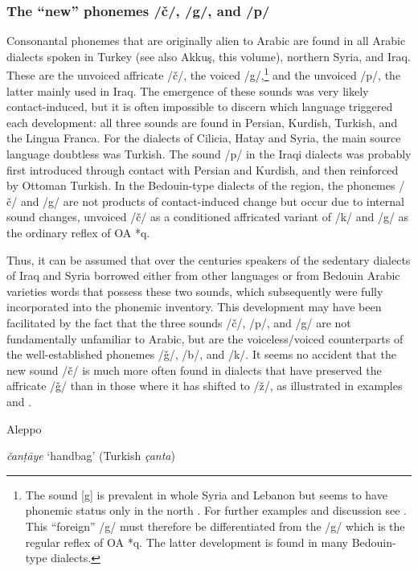 \documentclass[output=paper]{langsci/langscibook}
\begin{document}
  \subsubsection{The “new” phonemes /č/, /g/, and /p/} 

Consonantal phonemes that are originally alien to Arabic are found in all Arabic dialects spoken in Turkey (see also Akkuş, this volume), northern Syria, and Iraq. These are the unvoiced affricate /č/, the voiced /g/,\footnote{The sound [g] is prevalent in whole Syria and Lebanon but seems to have phonemic status only in the north \citep[26]{Sabuni1980}. For further examples and discussion see \citet{Ferguson1969}. This “foreign” /g/ must therefore be differentiated from the /g/ which is the regular reflex of OA *q. The latter development is found in many Bedouin-type dialects.} and the unvoiced /p/, the latter mainly used in Iraq. The emergence of these sounds was very likely contact-induced, but it is often impossible to discern which language triggered each development: all three sounds are found in Persian, Kurdish, Turkish, and the Lingua Franca. For the dialects of Cilicia, Hatay and Syria, the main source language doubtless was Turkish. The sound /p/ in the Iraqi dialects was probably first introduced through contact with Persian and Kurdish, and then reinforced by Ottoman Turkish. In the Bedouin-type dialects of the region, the phonemes /č/ and /g/ are not products of contact-induced change but occur due to internal sound changes, unvoiced /č/ as a conditioned affricated variant of /k/ and /g/ as the ordinary reflex of OA *q. 

Thus, it can be assumed that over the centuries speakers of the sedentary dialects of Iraq and Syria borrowed either from other languages or from Bedouin Arabic varieties words that possess these two sounds, which subsequently were fully incorporated into the phonemic inventory. This development may have been facilitated by the fact that the three sounds /č/, /p/, and /g/ are not fundamentally unfamiliar to Arabic, but are the voiceless/voiced counterparts of the well-established phonemes /ǧ/, /b/, and /k/. It seems no accident that the new sound /č/ is much more often found in dialects that have preserved the affricate /ǧ/ than in those where it has shifted to /ž/, as illustrated in examples  and .

\ea\label{Aleppo}
Aleppo \citep[205--210]{Sabuni1980}

\textit{čanṭāye} ‘handbag’ (Turkish \textit{çanta})
\end{document}
